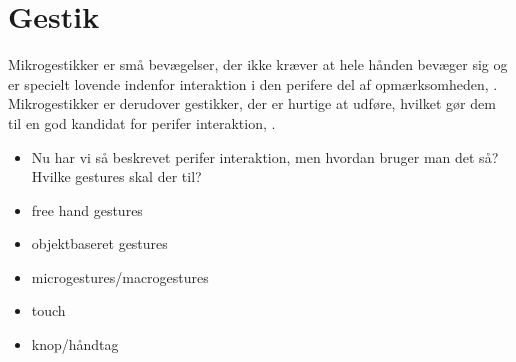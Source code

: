 \section{Gestik}
\label{Gestik}


Mikrogestikker er små bevægelser, der ikke kræver at hele hånden bevæger sig og er specielt lovende indenfor interaktion i den perifere del af opmærksomheden, \parencite[s. 95]{PDF:PeripheralInteraction}. Mikrogestikker er derudover gestikker, der er hurtige at udføre, hvilket gør dem til en god kandidat for perifer interaktion, \parencite[s. 96]{PDF:PeripheralInteraction}. 


\begin{itemize}
	\item Nu har vi så beskrevet perifer interaktion, men hvordan bruger man det så? Hvilke gestures skal der til?
	\item free hand gestures
	\item objektbaseret gestures
	\item microgestures/macrogestures
	\item touch
	\item knop/håndtag 
\end{itemize}
